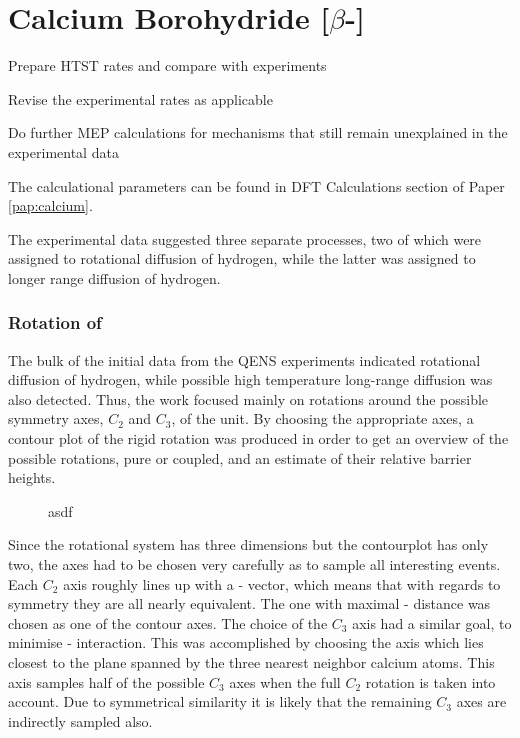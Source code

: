\section{Calcium Borohydride [$\beta$-]}
\label{sec:borohydrides-calcium}

\bit
\item Prepare HTST rates and compare with experiments
\item Revise the experimental rates as applicable
\item Do further MEP calculations for mechanisms that still remain unexplained in the experimental data
\eit

The calculational parameters can be found in DFT Calculations section of Paper \ref{pap:calcium}.

The experimental data suggested three separate processes, two of which were assigned to rotational diffusion of hydrogen, while the latter was assigned to longer range diffusion of hydrogen.

\subsubsection{Rotation of }
The bulk of the initial data from the QENS experiments indicated rotational diffusion of hydrogen, while possible high temperature long-range diffusion was also detected.
Thus, the work focused mainly on rotations around the possible symmetry axes, $C_2$ and $C_3$, of the  unit.
By choosing the appropriate axes, a contour plot of the rigid rotation was produced in order to get an overview of the possible rotations, pure or coupled, and an estimate of their relative barrier heights.

\begin{figure}[h]
\begin{center}
    \parbox{0.85\linewidth}{
      \caption{asdf
      }
      \label{fig:ca-rotational}
    }

\end{center}
\end{figure}

Since the rotational system has three dimensions but the contourplot has only two, the axes had to be chosen very carefully as to sample all interesting events.
Each $C_2$ axis roughly lines up with a - vector, which means that with regards to symmetry they are all nearly equivalent.
The one with maximal - distance was chosen as one of the contour axes.
The choice of the $C_3$ axis had a similar goal, to minimise - interaction.
This was accomplished by choosing the axis which lies closest to the plane spanned by the three nearest neighbor calcium atoms.
This axis samples half of the possible $C_3$ axes when the full $C_2$ rotation is taken into account.
Due to symmetrical similarity it is likely that the remaining $C_3$ axes are indirectly sampled also.

